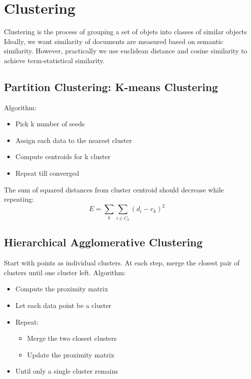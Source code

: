 \chapter{Clustering}
\begin{multicols*}{2}

\noindent Clustering is the process of grouping a set of objets into classes of similar objects\\

\noindent Ideally, we want similarity of documents are measured based on semantic similarity. However, practically we use euclidean distance and cosine similarity to achieve term-statistical similarity. 

\section{Partition Clustering: K-means Clustering}

\noindent Algorithm:
\begin{itemize}
    \item Pick k number of seeds
    \item Assign each data to the nearest cluster
    \item Compute centroids for k cluster
    \item Repeat till converged
\end{itemize}

\noindent The sum of squared distances from cluster centroid should decrease while repeating:
$$E=\sum_k \sum_{i \in C_k} (d_i - c_k)^2$$

\section{Hierarchical Agglomerative Clustering}
\noindent Start with points as individual clusters. At each step, merge the closest pair of clusters until one cluster left. 
\noindent Algorithm:
\begin{itemize}
    \item Compute the proximity matrix
    \item Let each data point be a cluster
    \item Repeat:
    \begin{itemize}
        \item Merge the two closest clusters
        \item Update the proximity matrix
    \end{itemize}
    \item Until only a single cluster remains
\end{itemize}


\end{multicols*}
